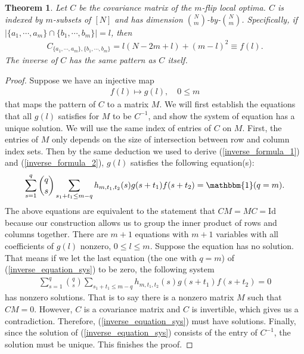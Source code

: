 \documentclass[10pt]{article}
\newtheorem{theorem}{\bf Theorem}
\newenvironment{Proof of lemma}{\noindent{\bf Proof of Lemma}}{\hfill$\Box$\newline}
\newenvironment{Proof of claim}{\noindent{\bf Proof of claim}}{\hfill$\Box$\newline}
\newenvironment{Proof of theorem}{\noindent{\bf Proof of Theorem}}{\hfill\scriptsize{$\Box$}\newline}
\newenvironment{Proof of theorems}{\noindent{\bf Proof of Theorems}}{\hfill$\Box$\newline}
\newenvironment{Proof of proposition}{\noindent{\bf Proof of Proposition}}{\hfill$\Box$\newline}
\newenvironment{Proof of propositions}{\noindent{\bf Proof of Propositions}}{\hfill$\Box$\newline}
\newenvironment{Proof of exercise}{\noindent{\it Proof of Exercise:}}{\hfill$\Box$}
\numberwithin{equation}{section}
\begin{document}
\begin{theorem}
    Let $C$ be the covariance matrix of the $m$-flip local optima. $C$ is indexed by $m$-subsets of $[N]$ and has dimension $\binom{N}{m}$-by-$\binom{N}{m}$. Specifically, if $|\{a_1,\cdots, a_m\} \cap \{b_1,\cdots, b_m\}| = l$, then
    \begin{align}
        C_{\{a_1,\cdots, a_m\},\{b_1,\cdots, b_m\}} = l(N-2m+l)+(m-l)^2 \equiv f(l).
    \end{align}
    The inverse of $C$ has the same pattern as $C$ itself.
\end{theorem}
\begin{proof}
    Suppose we have an injective map
    \begin{align}
        f(l) \mapsto g(l), \quad 0 \leq m
    \end{align}
    that maps the pattern of $C$ to a matrix $M$. We will first establish the equations that all $g(l)$ satisfies for $M$ to be $C^{-1}$, and show the system of equation has a unique solution. We will use the same index of entries of $C$ on $M$. First, the entries of $M$ only depends on the size of intersection between row and column index sets. Then by the same deduction we used to derive (\ref{inverse_formula_1}) and (\ref{inverse_formula_2}), $g(l)$ satisfies the following equation(s):
    \begin{align} \label{inverse_equation_sys}
        \sum_{s=1}^{q} \binom{q}{s} \sum_{s_1+t_1 \leq m-q} h_{m,t_1,t_2}(s) g(s+t_1) f(s+t_2) = \mathbbm{1}(q=m).
    \end{align}
    The above equations are equivalent to the statement that $CM = MC = \text{Id}$ because our construction allows us to group the inner product of rows and columns together. There are $m+1$ equations with $m+1$ variables with all coefficients of $g(l)$ nonzero, $0 \leq l \leq m$. Suppose the equation has no solution. That means if we let the last equation (the one with $q = m$) of (\ref{inverse_equation_sys}) to be zero, the following system
    \begin{align}
        \sum_{s=1}^{q} \binom{q}{s} \sum_{s_1+t_1 \leq m-q} h_{m,t_1,t_2}(s) g(s+t_1) f(s+t_2) = 0
    \end{align}
    has nonzero solutions. That is to say there is a nonzero matrix $M$ such that $CM=0$. However, $C$ is a covariance matrix and $C$ is invertible, which gives us a contradiction. Therefore, (\ref{inverse_equation_sys}) must have solutions. Finally, since the solution of (\ref{inverse_equation_sys}) consists of the entry of $C^{-1}$, the solution must be unique. This finishes the proof.
\end{proof}
\end{document}
